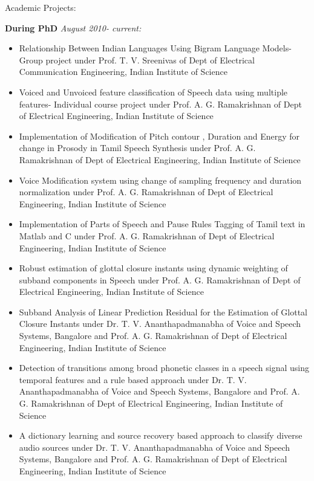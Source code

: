 \documentclass[10pt]{article}
\begin{document}
\begin{cv}
\begin{cvlist}{Academic Projects:}
\item \textbf{ During PhD} \textit{August 2010- current:}
\begin{itemize}\itemsep=0.25em
	\item
	Relationship Between Indian Languages Using Bigram Language Models- Group
project under Prof. T. V. Sreenivas of Dept of Electrical Communication Engineering,
Indian Institute of Science

\item
Voiced and Unvoiced feature classification of Speech data using multiple features-
Individual course project under Prof. A. G. Ramakrishnan of Dept of Electrical
Engineering, Indian Institute of Science

\item
Implementation of Modification of Pitch contour , Duration and Energy   for change in Prosody in Tamil Speech Synthesis under Prof. A. G. Ramakrishnan of Dept of Electrical
Engineering, Indian Institute of Science
\item
Voice Modification system using change of sampling frequency and duration normalization under Prof. A. G. Ramakrishnan of Dept of Electrical
Engineering, Indian Institute of Science
\item
Implementation of Parts of Speech and Pause Rules Tagging of Tamil text in Matlab and C under Prof. A. G. Ramakrishnan of Dept of Electrical
Engineering, Indian Institute of Science
\item
Robust estimation of glottal closure instants using dynamic weighting of subband components in Speech under Prof. A. G. Ramakrishnan of Dept of Electrical
Engineering, Indian Institute of Science

\item Subband Analysis of Linear Prediction Residual for the Estimation of Glottal Closure Instants under Dr. T. V. Ananthapadmanabha of Voice and Speech Systems, Bangalore and Prof. A. G. Ramakrishnan of Dept of Electrical Engineering, Indian Institute of Science

\item Detection of transitions among broad phonetic classes in a speech signal
          using temporal features and a rule based approach under Dr. T. V. Ananthapadmanabha of Voice and Speech Systems, Bangalore and Prof. A. G. Ramakrishnan of Dept of Electrical Engineering, Indian Institute of Science

\item A dictionary learning and source recovery based approach to classify diverse
                               audio sources under Dr. T. V. Ananthapadmanabha of Voice and Speech Systems, Bangalore and Prof. A. G. Ramakrishnan of Dept of Electrical Engineering, Indian Institute of Science
                               

\end{itemize}
\end{cvlist}
\end{cv}
\end{document}
